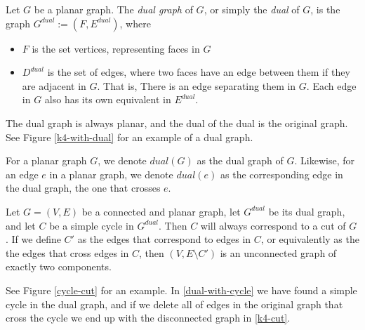 \begin{definition}
    Let $G$ be a planar graph. The \emph{dual graph} of $G$, or simply the \emph{dual} of $G$, is the graph $G^{dual} := (F, E^{dual})$, where 
    \begin{itemize}
        \item $F$ is the set vertices, representing faces in $G$
        \item $D^{dual}$ is the set of edges, where two faces have an edge between them if they are adjacent in $G$. That is, There is an edge separating them in $G$. Each edge in $G$ also has its own equivalent in $E^{dual}$.
    \end{itemize}
    The dual graph is always planar, and the dual of the dual is the original graph. See Figure \ref{k4-with-dual} for an example of a dual graph.
\end{definition}

For a planar graph $G$, we denote $dual(G)$ as the dual graph of $G$. Likewise, for an edge $e$ in a planar graph, we denote $dual(e)$ as the corresponding edge in the dual graph, the one that crosses $e$.

\begin{fact}
\label{dual-cycle-is-real-cut}
    Let $G = (V, E)$ be a connected and planar graph, let $G^{dual}$ be its dual graph, and let $C$ be a simple cycle in $G^{dual}$. Then $C$ will always correspond to a cut of $G$. If we define $C'$ as the edges that correspond to edges in $C$, or equivalently as the the edges that cross edges in $C$, then $(V,E \setminus C')$ is an unconnected graph of exactly two components.

    See Figure \ref{cycle-cut} for an example. In \ref{dual-with-cycle} we have found a simple cycle in the dual graph, and if we delete all of edges in the original graph that cross the cycle we end up with the disconnected graph in \ref{k4-cut}.
\end{fact}

